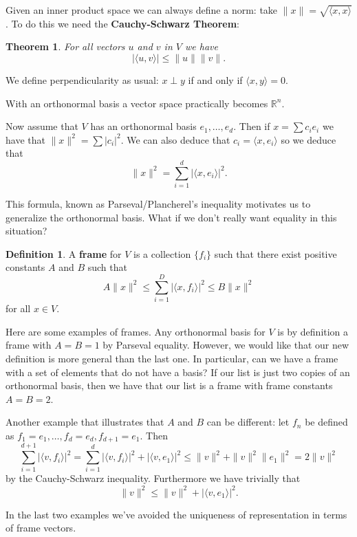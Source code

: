 \documentclass[12pt]{article}
\theoremstyle{plain}
\newtheorem{thm}{Theorem}
\theoremstyle{definition}
\newtheorem{defn}{Definition}
\begin{document}
Given an inner product space we can always define a norm: take $\|x\| = \sqrt{\langle x, x\rangle}$. To do this we need the \textbf{Cauchy-Schwarz Theorem}:

\begin{thm}
For all vectors $u$ and $v$ in $V$ we have 
\[|\langle u, v \rangle | \leq \|u\|\|v\|.\]
\end{thm}

We define perpendicularity as usual: $x \perp y$ if and only if $\langle x, y \rangle = 0$.

With an orthonormal basis a vector space practically becomes $\mathbb{R}^n$.

Now assume that $V$ has an orthonormal basis $e_1, \dots, e_d$. Then if $x = \sum c_ie_i$ we have that $\|x\|^2 = \sum |c_i|^2$. We can also deduce that $c_i = \langle x, e_i\rangle$ so we deduce that 
\[\|x\|^2 = \sum_{i = 1}^d|\langle x, e_i\rangle|^2.\]

This formula, known as Parseval/Plancherel's inequality motivates us to generalize the orthonormal basis. What if we don't really want equality in this situation?

\begin{defn}
A \textbf{frame} for $V$ is a collection $\{f_i\}$ such that there exist positive constants $A$ and $B$ such that 
\[A\|x\|^2 \leq \sum_{i = 1}^D|\langle x, f_i\rangle|^2 \leq B\|x\|^2\]
for all $x \in V$.
\end{defn}

Here are some examples of frames. Any orthonormal basis for $V$ is by definition a frame with $A = B = 1$ by Parseval equality. However, we would like that our new definition is more general than the last one. In particular, can we have a frame with a set of elements that do not have a basis? If our list is just two copies of an orthonormal basis, then we have that our list is a frame with frame constants $A = B = 2$.

Another example that illustrates that $A$ and $B$ can be different: let $f_n$ be defined as $f_1 = e_1,\dotsc, f_d = e_d, f_{d + 1} = e_1$. Then 
\[\sum_{i = 1}^{d + 1}|\langle v, f_i\rangle|^2 = \sum_{i = 1}^d|\langle v, f_i \rangle|^2 + |\langle v, e_1\rangle|^2 \leq \|v\|^2 + \|v\|^2\|e_1\|^2 = 2\|v\|^2\]
by the Cauchy-Schwarz inequality. Furthermore we have trivially that 
\[\|v\|^2 \leq \|v\|^2 + |\langle v, e_1\rangle|^2.\]

In the last two examples we've avoided the uniqueness of representation in terms of frame vectors.
\end{document}
